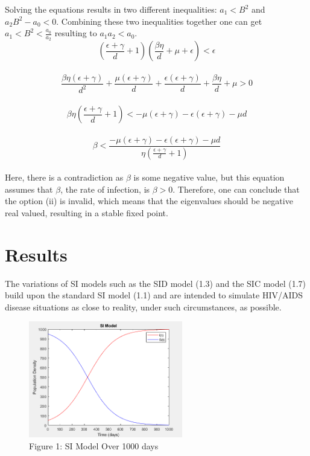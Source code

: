 \documentclass[a4paper, final, 12pt]{article}
\numberwithin{equation}{section}
\begin{document}
Solving the equations results in two different inequalities: $a_1 < B^2$ and $a_2B^2-a_0 < 0$. Combining these two inequalities together one can get $a_1<B^2<\frac{a_0}{a_2}$ resulting to $a_1a_2 < a_0$. \\
$$(\frac{\epsilon + \gamma}{d}+1)(\frac{\beta \eta}{d} + \mu + \epsilon) < \epsilon$$\\
$$\frac{\beta \eta (\epsilon + \gamma)}{d^2}+\frac{\mu(\epsilon+\gamma)}{d}+\frac{\epsilon(\epsilon + \gamma)}{d} + \frac{\beta \eta}{d}+\mu > 0$$\\
$$\beta \eta(\frac{\epsilon + \gamma}{d}+1) < -\mu(\epsilon + \gamma) - \epsilon(\epsilon + \gamma) - \mu d$$\\
$$\beta < \frac{-\mu(\epsilon + \gamma) - \epsilon(\epsilon + \gamma) - \mu d}{\eta ( \frac{\epsilon + \gamma}{d}+1)}$$\\
\hspace{22pt}Here, there is a contradiction as $\beta$ is some negative value, but this equation assumes that $\beta$, the rate of infection, is $\beta > 0$. Therefore, one can conclude that the option (ii) is invalid, which means that the eigenvalues should be negative real valued, resulting in a stable fixed point.\\


\section{Results}

\hspace{22pt} The variations of SI models such as the SID model (1.3) and the SIC model (1.7) build upon the standard SI model (1.1) and are intended to simulate HIV/AIDS disease situations as close to reality, under such circumstances, as possible. \\

\begin{figure}[!ht] 
    \centering
    \includegraphics[width=0.6\textwidth]{image (2).png}
    \caption{Figure 1: SI Model Over 1000 days}
    \label{fig:matrix3}
\end{figure}
\end{document}
